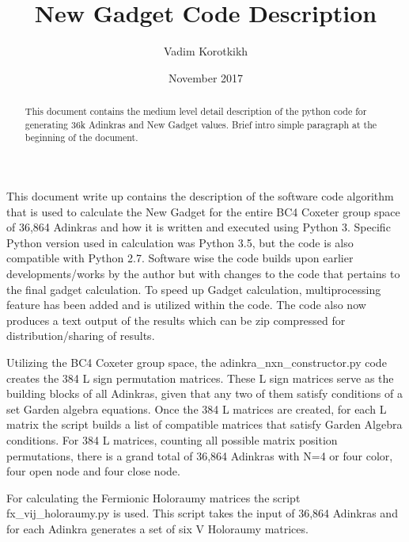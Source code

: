 \documentclass[12pt, letterpaper]{article}
\title{New Gadget Code Description}
\author{Vadim Korotkikh}
\date{November 2017}
\begin{document}
\maketitle

\begin{abstract}
This document contains the medium level detail description of the python code
for generating 36k Adinkras and New Gadget values. Brief intro simple paragraph
at the beginning of the document.
\end{abstract}

This document write up contains the description of the software code algorithm
that is used to calculate the New Gadget for the entire BC4 Coxeter group space
of 36,864 Adinkras and how it is written and executed using Python 3.
Specific Python version used in calculation was Python 3.5, but the code is also
compatible with Python 2.7.
Software wise the code builds upon earlier developments/works by the author but
with changes to the code that pertains to the final gadget calculation.
To speed up Gadget calculation, multiprocessing feature has been added and is
utilized within the code. The code also now produces a text output of the
results which can be zip compressed for distribution/sharing of results.\par
Utilizing the BC4 Coxeter group space, the adinkra{\_}nxn{\_}constructor.py
code creates the 384 L sign permutation matrices. These L sign matrices serve as the building
blocks of all Adinkras, given that any two of them satisfy conditions of a set Garden algebra
equations. Once the 384 L matrices are created, for each L matrix the script builds a list of
compatible matrices that satisfy Garden Algebra conditions. For 384 L matrices, counting all
possible matrix position permutations, there is a grand total of 36,864 Adinkras with N=4 or
four color, four open node and four close node.\par
For calculating the Fermionic Holoraumy matrices the script fx{\_}vij{\_}holoraumy.py is used.
This script takes the input of 36,864 Adinkras and for each Adinkra generates a set of six
V Holoraumy matrices.
\end{document}
